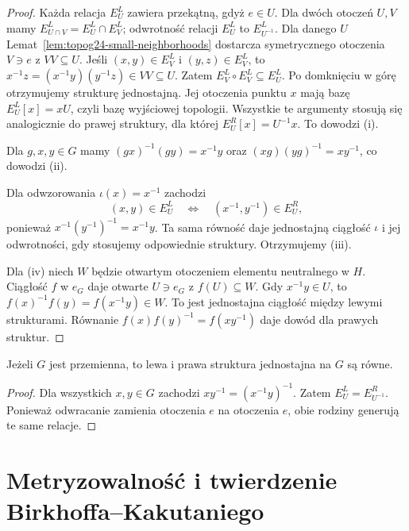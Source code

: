 \begin{proof}
Każda relacja \(E_U^L\)
zawiera przekątną, gdyż \(e\in U\).
Dla dwóch otoczeń \(U,V\)
mamy \(E_{U\cap V}^L=E_U^L\cap E_V^L\);
odwrotność relacji \(E_U^L\)
to \(E_{U^{-1}}^L\).
Dla danego \(U\)
Lemat~\ref{lem:topog24-small-neighborhoods}
dostarcza symetrycznego otoczenia \(V\ni e\)
z \(VV\subseteq U\).
Jeśli \((x,y)\in E_V^L\)
i \((y,z)\in E_V^L\),
to \(x^{-1}z=(x^{-1}y)(y^{-1}z)\in VV\subseteq U\).
Zatem \(E_V^L\circ E_V^L\subseteq E_U^L\).
Po domknięciu w górę otrzymujemy
strukturę jednostajną.
Jej otoczenia punktu \(x\)
mają bazę \(E_U^L[x]=xU\),
czyli bazę wyjściowej topologii.
Wszystkie te argumenty stosują się
analogicznie do prawej struktury,
dla której
\(E_U^R[x]=U^{-1}x\).
To dowodzi \textup{(i)}.

Dla \(g,x,y\in G\)
mamy \((gx)^{-1}(gy)=x^{-1}y\)
oraz \((xg)(yg)^{-1}=xy^{-1}\),
co dowodzi \textup{(ii)}.

Dla odwzorowania \(\iota(x)=x^{-1}\)
zachodzi
\[
 (x,y)\in E_U^L
 \quad\Longleftrightarrow\quad
 (x^{-1},y^{-1})\in E_U^R,
\]
ponieważ
\(x^{-1}(y^{-1})^{-1}=x^{-1}y\).
Ta sama równość daje jednostajną
ciągłość \(\iota\) i jej odwrotności,
gdy stosujemy odpowiednie struktury.
Otrzymujemy \textup{(iii)}.

Dla \textup{(iv)} niech \(W\)
będzie otwartym otoczeniem
elementu neutralnego w \(H\).
Ciągłość \(f\) w \(e_G\)
daje otwarte \(U\ni e_G\)
z \(f(U)\subseteq W\).
Gdy \(x^{-1}y\in U\),
to \(f(x)^{-1}f(y)=f(x^{-1}y)\in W\).
To jest jednostajna ciągłość
między lewymi strukturami.
Równanie \(f(x)f(y)^{-1}=f(xy^{-1})\)
daje dowód dla prawych struktur.
\end{proof}

\begin{wniosek}
\label{cor:topog24-abelian-uniform}
Jeżeli \(G\) jest przemienna,
to lewa i prawa struktura jednostajna
na \(G\) są równe.
\end{wniosek}
\begin{proof}
Dla wszystkich \(x,y\in G\)
zachodzi \(xy^{-1}=(x^{-1}y)^{-1}\).
Zatem
\(E_U^L=E_{U^{-1}}^R\).
Ponieważ odwracanie zamienia
otoczenia \(e\) na otoczenia \(e\),
obie rodziny generują te same relacje.
\end{proof}

\section{Metryzowalność i twierdzenie Birkhoffa--Kakutaniego}
\label{sec:topog24-metrization}


